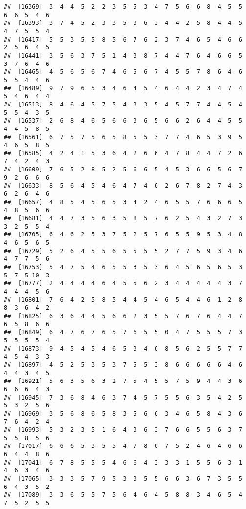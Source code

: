 \documentclass[
]{book}
\begin{document}
\begin{verbatim}
##  [16369]  3  4  4  5  2  2  3  5  5  3  4  7  5  6  6  8  4  5  5  6  6  5  4  6
##  [16393]  3  7  4  5  2  3  3  5  3  6  3  4  4  2  5  8  4  4  5  4  7  5  5  4
##  [16417]  5  5  3  5  5  8  5  6  7  6  2  3  7  4  6  5  4  6  6  2  5  6  4  5
##  [16441]  3  5  6  3  7  5  1  4  3  8  7  4  4  7  6  4  6  6  5  3  7  6  4  6
##  [16465]  4  5  6  5  6  7  4  6  5  6  7  4  5  5  7  8  6  4  6  5  5  4  4  6
##  [16489]  9  7  9  6  5  3  4  6  4  5  4  6  4  4  2  3  4  7  4  5  4  6  4  4
##  [16513]  8  4  6  4  5  7  5  4  3  3  5  4  5  7  7  4  4  5  4  5  5  4  3  5
##  [16537]  2  6  8  4  6  5  6  6  3  6  5  6  6  2  6  4  4  5  5  4  4  5  8  5
##  [16561]  6  7  5  7  5  6  5  8  5  5  3  7  7  4  6  5  3  9  5  4  6  5  8  5
##  [16585]  4  2  4  1  5  3  6  4  2  6  6  4  7  8  4  4  7  2  6  7  4  2  4  3
##  [16609]  7  6  5  2  8  5  2  5  6  6  5  4  5  3  6  6  5  6  7  9  2  6  6  6
##  [16633]  8  5  6  4  5  4  6  4  7  4  6  2  6  7  8  2  7  4  3  6  2  6  4  6
##  [16657]  4  8  5  4  5  6  5  3  4  2  4  6  5  5  7  6  6  6  5  4  8  5  6  6
##  [16681]  4  4  7  3  5  6  3  5  8  5  7  6  2  5  4  3  2  7  3  3  2  5  5  4
##  [16705]  6  4  6  2  5  3  7  5  2  5  7  6  5  5  9  5  3  4  8  4  6  5  6  5
##  [16729]  5  2  6  4  5  5  6  5  5  5  5  2  7  7  5  9  3  4  6  4  7  7  5  6
##  [16753]  5  4  7  5  4  6  5  5  3  5  3  6  4  5  6  5  6  5  3  5  7  5 10  3
##  [16777]  2  4  4  4  4  6  4  5  5  6  2  3  4  4  4  4  4  3  7  4  4  4  5  6
##  [16801]  7  6  4  2  5  8  5  4  4  5  4  6  5  4  4  6  1  2  8  8  3  6  4  2
##  [16825]  6  3  6  4  4  5  6  6  2  3  5  5  7  6  7  6  4  4  7  6  5  8  6  6
##  [16849]  6  4  7  6  7  6  5  7  6  5  5  0  4  7  5  5  5  7  3  5  5  5  5  4
##  [16873]  9  4  5  4  5  4  6  5  3  4  6  8  5  6  2  5  5  7  7  4  5  4  3  3
##  [16897]  4  5  2  5  3  5  3  7  5  5  3  8  6  6  6  6  6  4  6  4  4  3  4  5
##  [16921]  5  6  3  5  6  3  2  7  5  4  5  5  7  5  9  4  4  3  6  6  6  6  4  3
##  [16945]  7  3  6  8  4  6  3  7  4  5  7  5  5  6  3  5  4  2  5  5  3  2  5  6
##  [16969]  3  5  6  8  6  5  8  3  5  6  6  3  4  6  5  8  4  3  6  7  6  4  2  4
##  [16993]  5  3  2  3  5  1  6  4  3  6  3  7  6  6  5  5  6  3  7  5  5  8  5  6
##  [17017]  6  6  6  5  3  5  5  4  7  8  6  7  5  2  4  6  4  6  6  6  4  4  8  6
##  [17041]  6  7  8  5  5  5  4  6  6  4  3  3  3  1  5  5  6  3  1  4  6  3  4  6
##  [17065]  3  3  3  5  7  9  5  3  3  5  5  6  6  3  6  7  3  5  5  6  4  3  5  2
##  [17089]  3  3  6  5  5  7  5  6  4  6  4  5  8  8  3  4  6  5  4  7  5  2  5  5

\end{verbatim}
\end{document}
